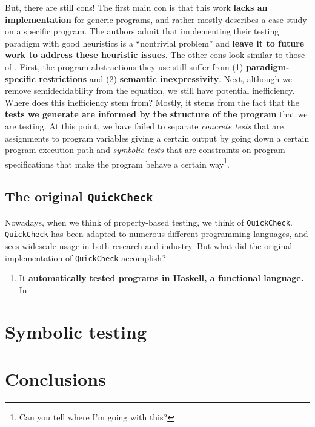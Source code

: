 \documentclass[acmsmall,review, nonacm]{acmart}
\begin{document}
But, there are still cons! The first main con is that this work \textbf{lacks an implementation} for generic programs, and rather mostly describes a case study on a specific program. The authors admit that implementing their testing paradigm with good heuristics is a ``nontrivial problem'' \cite{fink1997property} and \textbf{leave it to future work to address these heuristic issues}. The other cons look similar to those of \cite{beyer2004generating}. First, the program abstractions they use still suffer from (1) \textbf{paradigm-specific restrictions} and (2) \textbf{semantic inexpressivity}. Next, although we remove semidecidability from the equation, we still have potential inefficiency. Where does this inefficiency stem from? Mostly, it stems from the fact that the \textbf{tests we generate are informed by the structure of the program} that we are testing. At this point, we have failed to separate \textit{concrete tests} that are assignments to program variables giving a certain output by going down a certain program execution path and \textit{symbolic tests} that are constraints on program specifications that make the program behave a certain way\footnote{Can you tell where I'm going with this?}.

\subsection{The original \texttt{QuickCheck}}

Nowadays, when we think of property-based testing, we think of \texttt{QuickCheck}. \texttt{QuickCheck} has been adapted to numerous different programming languages, and sees widescale usage in both research and industry. But what did the original implementation of \texttt{QuickCheck} \cite{claessen2000quickcheck} accomplish?

\begin{enumerate}
  \item It \textbf{automatically tested programs in Haskell, a functional language.} In   
\end{enumerate}

\section{Symbolic testing}

\section{Conclusions}

\end{document}

